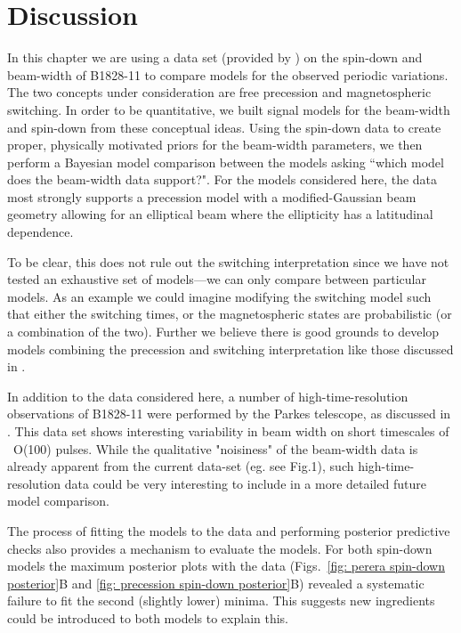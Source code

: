 \documentclass[../full_thesis/full_thesis.tex]{subfiles}
\begin{document}
\section{Discussion}
\label{sec: discussion}

In this chapter we are using a data set (provided by \citet{Lyne2010}) on the
spin-down and beam-width of B1828-11 to compare models for the observed
periodic variations.  The two concepts under consideration are free precession
and magnetospheric switching.  In order to be quantitative, we built signal
models for the beam-width and spin-down from these conceptual ideas. Using the
spin-down data to create proper, physically motivated priors for the beam-width
parameters, we then perform a Bayesian model comparison between the models
asking ``which model does the beam-width data support?". For the models
considered here, the data most strongly supports a precession model with a
modified-Gaussian beam geometry allowing for an elliptical beam where the
ellipticity has a latitudinal dependence.

To be clear, this does not rule out the switching interpretation since we have
not tested an exhaustive set of models---we can only compare between particular
models. As an example we could imagine modifying the switching model such that
either the switching times, or the magnetospheric states are probabilistic (or
a combination of the two).  Further we believe there is good grounds to develop
models combining the precession and switching interpretation like those
discussed in \citet{Jones2012}.

In addition to the data considered here, a number of
high-time-resolution observations of B1828-11 were performed
by the Parkes telescope, as discussed in \citet{Stairs2003}.
This data set shows interesting variability in beam width on short
timescales of ~O(100) pulses. While the qualitative "noisiness" of the
beam-width data is already apparent from the current data-set (eg. see
Fig.1), such high-time-resolution data could be very interesting to
include in a more detailed future model comparison.

The process of fitting the models to the data and performing posterior
predictive checks also provides a mechanism to evaluate the models. For both
spin-down models the maximum posterior plots with the data (Figs.~\ref{fig:
perera spin-down posterior}B and \ref{fig: precession spin-down posterior}B)
revealed a systematic failure to fit the second (slightly lower) minima. This
suggests new ingredients could be introduced to both models to explain this.
\end{document}
